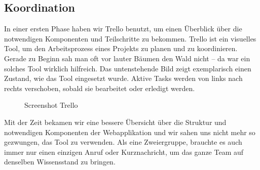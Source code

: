 \subsection{Koordination}

In einer ersten Phase haben wir Trello benutzt, um einen Überblick über die notwendigen Komponenten und Teilschritte zu bekommen. Trello ist ein visuelles Tool, um den Arbeitsprozess eines Projekts zu planen und zu koordinieren. Gerade zu Beginn sah man oft vor lauter Bäumen den Wald nicht -- da war ein solches Tool wirklich hilfreich. Das untenstehende Bild zeigt exemplarisch einen Zustand, wie das Tool eingesetzt wurde. Aktive Tasks werden von links nach rechts verschoben, sobald sie bearbeitet oder erledigt werden.
\begin{figure}[ht]
    \caption{Screenshot Trello \cite{fig:trello}}
\end{figure}

Mit der Zeit bekamen wir eine bessere Übersicht über die Struktur und notwendigen Komponenten der Webapplikation und wir sahen uns nicht mehr so gezwungen, das Tool zu verwenden. Als eine Zweiergruppe, brauchte es auch immer nur einen einzigen Anruf oder Kurznachricht, um das ganze Team auf denselben Wissensstand zu bringen.